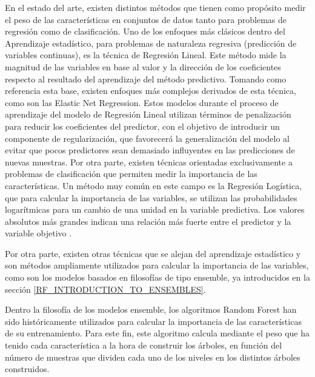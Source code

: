 \documentclass{uathesis-es}
\begin{document}
{	En el estado del arte, existen distintos métodos que tienen como propósito medir el peso de las características en conjuntos de datos tanto para problemas de regresión como de clasificación. Uno de los enfoques más clásicos dentro del Aprendizaje estadístico, para problemas de naturaleza regresiva (predicción de variables continuas), es la técnica de Regresión Lineal. Este método mide la magnitud de las variables en base al valor y la dirección de los coeficientes respecto al resultado del aprendizaje del método predictivo. Tomando como referencia esta base, existen enfoques más complejos derivados de esta técnica, como son las Elastic Net Regression. Estos modelos durante el proceso de aprendizaje del modelo de Regresión Lineal utilizan términos de penalización para reducir los coeficientes del predictor, con el objetivo de introducir un componente de regularización, que favorecerá la generalización del modelo al evitar que pocos predictores sean demasiado influyentes en las predicciones de nuevas muestras. Por otra parte, existen técnicas orientadas exclusivamente a problemas de clasificación que permiten medir la importancia de las características. Un método muy común en este campo es la Regresión Logística, que para calcular la importancia de las variables, se utilizan las probabilidades logarítmicas para un cambio de una unidad en la variable predictiva. Los valores absolutos más grandes indican una relación más fuerte entre el predictor y la variable objetivo \cite{Saarela2021}.
	
	
	Por otra parte, existen otras técnicas que se alejan del aprendizaje estadístico y son métodos ampliamente utilizados para calcular la importancia de las variables, como son los modelos basados en filosofías de tipo ensemble, ya introducidos en la sección \ref{RF_INTRODUCTION_TO_ENSEMBLES}.
	
	Dentro la filosofía de los modelos ensemble, los algoritmos Random Forest han sido históricamente utilizados para calcular la importancia de las características de su entrenamiento. Para este fin, este algoritmo calcula mediante el peso que ha tenido cada característica a la hora de construir los árboles, en función del número de muestras que dividen cada uno de los niveles en los distintos árboles construidos.
	
}
\end{document}
